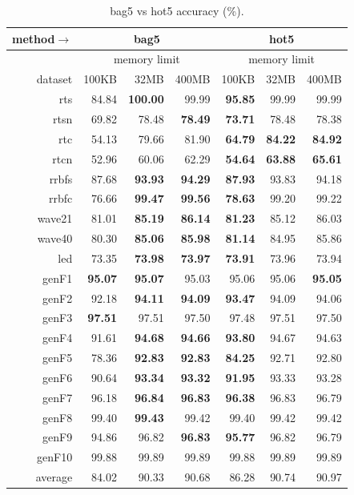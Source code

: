\begin{table}
\caption{{\sc bag5} vs {\sc hot5} accuracy (\%).}
\label{tab:bag5_vs_hot5_acc}
\centering
\begin{tabular}{|r||r|r|r||r|r|r|}
\hline
method$\rightarrow$ & \multicolumn{3}{|c||}{{\sc bag5}} & \multicolumn{3}{|c|}{{\sc hot5}} \\
\hline
 & \multicolumn{3}{|c||}{memory limit} & \multicolumn{3}{|c|}{memory limit} \\
\hline
dataset & 100KB & 32MB & 400MB & 100KB & 32MB & 400MB \\
\hline
{\sc rts} & 84.84 & \textbf{100.00} & 99.99 & \textbf{95.85} & 99.99 & 99.99 \\
{\sc rtsn} & 69.82 & 78.48 & \textbf{78.49} & \textbf{73.71} & 78.48 & 78.38 \\
{\sc rtc} & 54.13 & 79.66 & 81.90 & \textbf{64.79} & \textbf{84.22} & \textbf{84.92} \\
{\sc rtcn} & 52.96 & 60.06 & 62.29 & \textbf{54.64} & \textbf{63.88} & \textbf{65.61} \\
{\sc rrbfs} & 87.68 & \textbf{93.93} & \textbf{94.29} & \textbf{87.93} & 93.83 & 94.18 \\
{\sc rrbfc} & 76.66 & \textbf{99.47} & \textbf{99.56} & \textbf{78.63} & 99.20 & 99.22 \\
{\sc wave21} & 81.01 & \textbf{85.19} & \textbf{86.14} & \textbf{81.23} & 85.12 & 86.03 \\
{\sc wave40} & 80.30 & \textbf{85.06} & \textbf{85.98} & \textbf{81.14} & 84.95 & 85.86 \\
{\sc led} & 73.35 & \textbf{73.98} & \textbf{73.97} & \textbf{73.91} & 73.96 & 73.94 \\
{\sc genF1} & \textbf{95.07} & \textbf{95.07} & 95.03 & 95.06 & 95.06 & \textbf{95.05} \\
{\sc genF2} & 92.18 & \textbf{94.11} & \textbf{94.09} & \textbf{93.47} & 94.09 & 94.06 \\
{\sc genF3} & \textbf{97.51} & 97.51 & 97.50 & 97.48 & 97.51 & 97.50 \\
{\sc genF4} & 91.61 & \textbf{94.68} & \textbf{94.66} & \textbf{93.80} & 94.67 & 94.63 \\
{\sc genF5} & 78.36 & \textbf{92.83} & \textbf{92.83} & \textbf{84.25} & 92.71 & 92.80 \\
{\sc genF6} & 90.64 & \textbf{93.34} & \textbf{93.32} & \textbf{91.95} & 93.33 & 93.28 \\
{\sc genF7} & 96.18 & \textbf{96.84} & \textbf{96.83} & \textbf{96.38} & 96.83 & 96.79 \\
{\sc genF8} & 99.40 & \textbf{99.43} & 99.42 & 99.40 & 99.42 & 99.42 \\
{\sc genF9} & 94.86 & 96.82 & \textbf{96.83} & \textbf{95.77} & 96.82 & 96.79 \\
{\sc genF10} & 99.88 & 99.89 & 99.89 & 99.88 & 99.89 & 99.89 \\
\hline
average & 84.02 & 90.33 & 90.68 & 86.28 & 90.74 & 90.97 \\
\hline
\end{tabular}
\end{table}

